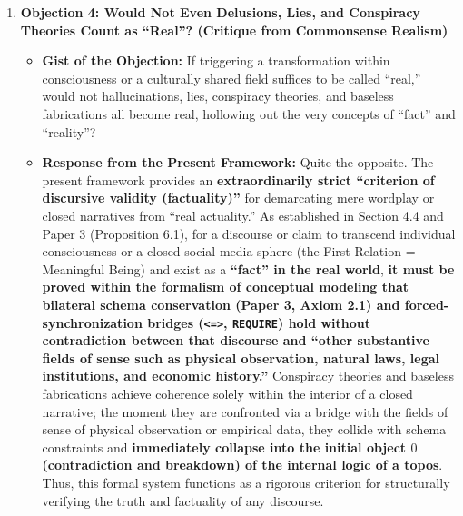 \documentclass[11pt,a4paper]{article}
\theoremstyle{definition}
\theoremstyle{plain}
\begin{document}
\begin{enumerate}
    \item \textbf{Objection 4: Would Not Even Delusions, Lies, and Conspiracy Theories Count as ``Real''? (Critique from Commonsense Realism)}
    \begin{itemize}
        \item \textbf{Gist of the Objection:} If triggering a transformation within consciousness or a culturally shared field suffices to be called ``real,'' would not hallucinations, lies, conspiracy theories, and baseless fabrications all become real, hollowing out the very concepts of ``fact'' and ``reality''?
        \item \textbf{Response from the Present Framework:} Quite the opposite. The present framework provides an \textbf{extraordinarily strict ``criterion of discursive validity (factuality)''} for demarcating mere wordplay or closed narratives from ``real actuality.'' As established in Section 4.4 and Paper 3 (Proposition 6.1), for a discourse or claim to transcend individual consciousness or a closed social-media sphere (the First Relation = Meaningful Being) and exist as a \textbf{``fact'' in the real world}, \textbf{it must be proved within the formalism of conceptual modeling that bilateral schema conservation (Paper 3, Axiom 2.1) and forced-synchronization bridges (\texttt{<=>}, \texttt{REQUIRE}) hold without contradiction between that discourse and ``other substantive fields of sense such as physical observation, natural laws, legal institutions, and economic history.''} Conspiracy theories and baseless fabrications achieve coherence solely within the interior of a closed narrative; the moment they are confronted via a bridge with the fields of sense of physical observation or empirical data, they collide with schema constraints and \textbf{immediately collapse into the initial object $0$ (contradiction and breakdown) of the internal logic of a topos}. Thus, this formal system functions as a rigorous criterion for structurally verifying the truth and factuality of any discourse.
    \end{itemize}


\end{enumerate}
\end{document}
